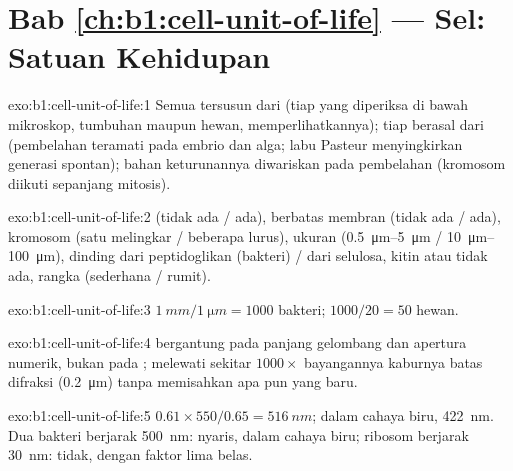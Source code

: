 \section*{Bab \ref{ch:b1:cell-unit-of-life} --- Sel: Satuan Kehidupan}

\begin{solution}{exo:b1:cell-unit-of-life:1}
Semua  tersusun dari  (tiap  yang diperiksa di bawah
mikroskop, tumbuhan maupun hewan, memperlihatkannya); tiap  berasal
dari  (pembelahan teramati pada embrio dan alga; labu Pasteur
menyingkirkan generasi spontan); bahan keturunannya diwariskan pada
pembelahan (kromosom diikuti sepanjang mitosis).
\end{solution}

\begin{solution}{exo:b1:cell-unit-of-life:2}
 (tidak ada / ada),  berbatas membran (tidak ada / ada),
kromosom (satu melingkar / beberapa lurus), ukuran
(\qtyrange{0.5}{5}{\micro m} / \qtyrange{10}{100}{\micro m}), dinding
 dari peptidoglikan (bakteri) / dari selulosa, kitin atau tidak ada,
rangka  (sederhana / rumit).
\end{solution}

\begin{solution}{exo:b1:cell-unit-of-life:3}
$\qty{1}{mm}/\qty{1}{\micro m} = 1000$ bakteri; $1000/20 = 50$ 
hewan.
\end{solution}

\begin{solution}{exo:b1:cell-unit-of-life:4}
 bergantung pada panjang gelombang dan apertura numerik,
bukan pada ; melewati sekitar $1000\times$ bayangannya
 kaburnya batas difraksi (\qty{0.2}{\micro m}) tanpa
memisahkan apa pun yang baru.
\end{solution}

\begin{solution}{exo:b1:cell-unit-of-life:5}
$0.61\times 550/0.65 = \qty{516}{nm}$; dalam cahaya biru, \qty{422}{nm}.
Dua bakteri berjarak \qty{500}{nm}: nyaris, dalam cahaya biru; ribosom
berjarak \qty{30}{nm}: tidak, dengan faktor lima belas.
\end{solution}

